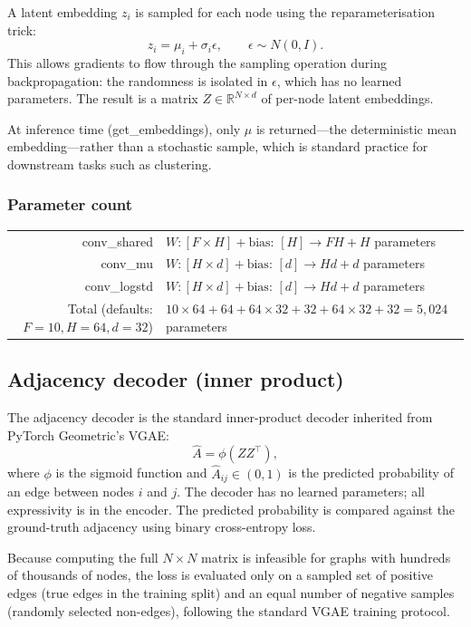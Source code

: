 \documentclass[11pt]{article}
\begin{document}
A latent embedding $z_i$ is sampled for each node using the
reparameterisation trick:
\[ z_i = \mu_i + \sigma_i \epsilon, \qquad \epsilon \sim N(0, I). \]
This allows gradients to flow through the sampling operation during
backpropagation: the randomness is isolated in $\epsilon$, which has
no learned parameters. The result is a matrix $Z \in \mathbb{R}^{N
\times d}$ of per-node latent embeddings.

At inference time (get\_embeddings), only $\mu$ is returned---the
deterministic mean embedding---rather than a stochastic sample,
which is standard practice for downstream tasks such as
clustering.

\subsubsection{Parameter count}

\begin{table}[H]
\centering
\begin{tabular}{ r p{} }
conv\_shared & $W: [F \times H] + \text{bias}$: $[H] \to F H + H$ parameters \\
conv\_mu & $W: [H \times d] + \text{bias}$: $[d] \to H d + d$ parameters \\
conv\_logstd & $W: [H \times d] + \text{bias}$: $[d] \to H d + d$ parameters \\
Total (defaults: $F=10, H=64, d=32$)
& $10 \times 64 + 64 + 64 \times 32 + 32 + 64 \times 32 + 32 = 5,024$ parameters
\end{tabular}
\end{table}


\subsection{Adjacency decoder (inner product)}
      
The adjacency decoder is the standard inner-product decoder inherited
from PyTorch Geometric's VGAE:
\[ \hat{A} = \phi( Z Z^\top ), \]
where $\phi$ is the sigmoid function and $\hat{A}_{ij} \in (0,1)$ is
the predicted probability of an edge between nodes $i$ and $j$. The
decoder has no learned parameters; all expressivity is in the
encoder. The predicted probability is compared against the
ground-truth adjacency using binary cross-entropy loss.

Because computing the full $N \times N$ matrix is infeasible for
graphs with hundreds of thousands of nodes, the loss is
evaluated only on a sampled set of positive edges (true edges in
the training split) and an equal number of negative samples
(randomly selected non-edges), following the standard VGAE
training protocol. 
\end{document}
